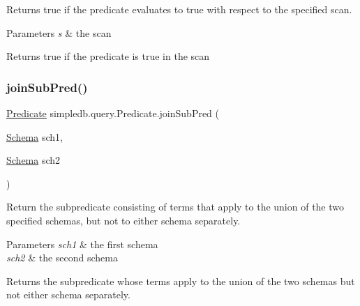 Returns true if the predicate evaluates to true with respect to the specified scan. 
\begin{DoxyParams}{Parameters}
{\em s} & the scan \\
\hline
\end{DoxyParams}
\begin{DoxyReturn}{Returns}
true if the predicate is true in the scan 
\end{DoxyReturn}
\mbox{\label{classsimpledb_1_1query_1_1Predicate_a38645596a0d83c05ec9017984f6ffa86}} 
\subsubsection{\texorpdfstring{join\+Sub\+Pred()}{joinSubPred()}}
{\footnotesize\ttfamily \hyperlink{classsimpledb_1_1query_1_1Predicate}{Predicate} simpledb.\+query.\+Predicate.\+join\+Sub\+Pred (\begin{DoxyParamCaption}\item[{\hyperlink{classsimpledb_1_1record_1_1Schema}{Schema}}]{sch1,  }\item[{\hyperlink{classsimpledb_1_1record_1_1Schema}{Schema}}]{sch2 }\end{DoxyParamCaption})\hspace{0.3cm}{\ttfamily [inline]}}

Return the subpredicate consisting of terms that apply to the union of the two specified schemas, but not to either schema separately. 
\begin{DoxyParams}{Parameters}
{\em sch1} & the first schema \\
\hline
{\em sch2} & the second schema \\
\hline
\end{DoxyParams}
\begin{DoxyReturn}{Returns}
the subpredicate whose terms apply to the union of the two schemas but not either schema separately. 
\end{DoxyReturn}
\mbox{\label{classsimpledb_1_1query_1_1Predicate_a75d25b296d403755e0f49f13aabb290d}} 
